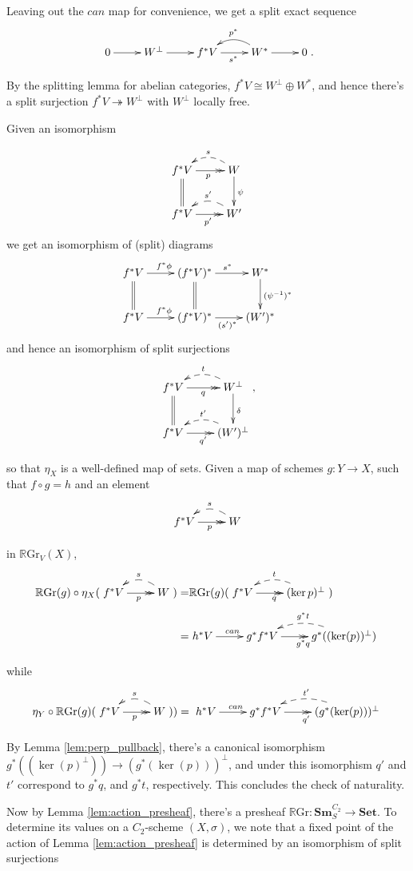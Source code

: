 \documentclass[edeposit,fullpage]{uiucthesis2009}
\newcommand{\RGr}{\mathbb R\mathrm{Gr}}
\newcommand{\Set}{\mathbf{Set}}
\newcommand{\Sm}[1]{\mathbf{Sm}_{#1}}
\theoremstyle{plain}
\numberwithin{lemma}{section}
\theoremstyle{definition}
\begin{document}
Leaving out the $can$ map for convenience, we get a split exact sequence 
\[
\xymatrix{0 \ar[r] & W^\perp \ar[r] & f^*V \ar[r]_{s^*}& \ar@/_1.0pc/[l]_{p^*} W^*
\ar[r] & 0}.
\]

By the splitting lemma for abelian categories, $f^*V \cong W^\perp
\oplus W^*$, and hence there's a split surjection $f^*V
\twoheadrightarrow W^\perp$ with $W^\perp$ locally free. 

Given an isomorphism 

\[
\xymatrix{f^*V \ar@{>>}[r]_p \ar@{=}[d]& \ar@/_1.0pc/@{-->}[l]_sW \ar[d]^\psi\\
f^*V \ar@{>>}[r]_{p'} & \ar@/_1.0pc/@{-->}[l]_{s'}W'}
\]
we get an isomorphism of (split) diagrams
\[
\xymatrix{f^*V \ar[r]^{f^*\phi}\ar@{=}[d] &(f^*V)^*\ar[r]^{s^*} \ar@{=}[d] & W^* \ar[d]^{(\psi^{-1})^*}\\
f^*V \ar[r]^{f^*\phi} & (f^*V)^* \ar[r]_{(s')^* }& (W')^*}
\]
and hence an isomorphism of split surjections
\[
\xymatrix{f^*V \ar@{>>}[r]_q \ar@{=}[d]& \ar@/_1.0pc/@{-->}[l]_tW^\perp \ar[d]^\delta\\
f^*V \ar@{>>}[r]_{q'} & \ar@/_1.0pc/@{-->}[l]_{t'}(W')^\perp},
\]

so that $\eta_X$ is a well-defined map of sets. Given a map of schemes
$g : Y \rightarrow X$, such that $f\circ g = h$ and an element 
\[
\xymatrix{f^*V \ar@{>>}[r]_p & \ar@/_1.0pc/@{-->}[l]_sW}
\]

in $\RGr_V(X)$, 
\begin{align*}
\RGr(g) \circ \eta_X(\xymatrix{f^*V \ar@{>>}[r]_p &
  \ar@/_1.0pc/@{-->}[l]_sW}) = & \RGr(g)( \xymatrix{f^*V \ar@{>>}[r]_q
  & \ar@/_1.0pc/@{-->}[l]_t(\ker p)^\perp})\\
 = & \xymatrix{h^*V \ar[r]^{can} & g^*f^*V \ar@{>>}[r]_{g^*q} &
  \ar@/_1.0pc/@{-->}[l]_{g^*t} g^*((\ker(p))^\perp)}
\end{align*}

while
\begin{align*}
\eta_Y\circ\RGr(g)(\xymatrix{f^*V \ar@{>>}[r]_p &
  \ar@/_1.0pc/@{-->}[l]_sW})) = \xymatrix{h^*V \ar[r]^{can} & g^*f^*V \ar@{>>}[r]_{q'} &
  \ar@/_1.0pc/@{-->}[l]_{t'} (g^*(\ker(p)))^\perp}
\end{align*}

By Lemma \ref{lem:perp_pullback}, there's a canonical isomorphism
$g^*((\ker(p)^\perp)) \rightarrow (g^*(\ker(p)))^\perp$, and under
this isomorphism $q'$ and $t'$ correspond to $g^*q$, and $g^*t$,
respectively. This concludes the check of naturality.


Now by Lemma \ref{lem:action_presheaf}, there's a presheaf $\RGr :
\Sm{S}^{C_2} \rightarrow \Set$. To determine its values on a
$C_2$-scheme $(X,\sigma)$, we note that a fixed point of the action of Lemma
\ref{lem:action_presheaf} is determined by an isomorphism of split
surjections
\end{document}
